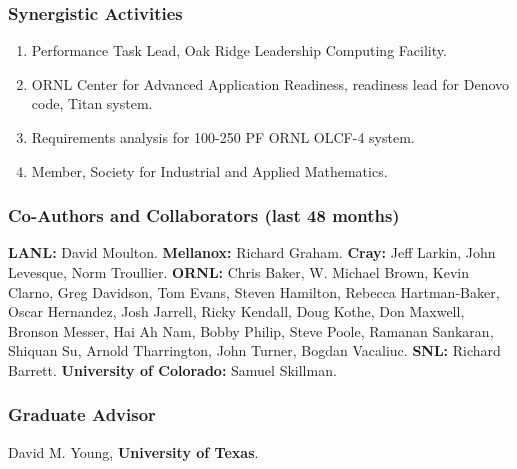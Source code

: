 
\vspace*{-3ex}
\subsubsection*{Synergistic Activities}
\vspace{-1ex}
%
\begin{enumerate}
\item Performance Task Lead, Oak Ridge Leadership Computing Facility.
\item ORNL Center for Advanced Application Readiness, readiness lead for Denovo code, Titan system.
\item Requirements analysis for 100-250 PF ORNL OLCF-4 system.
\item Member, Society for Industrial and Applied Mathematics.
\end{enumerate}


\vspace*{-3ex}
\subsubsection*{Co-Authors and Collaborators (last 48 months)}
\vspace{-1ex}

{\bf LANL:} David Moulton.
{\bf Mellanox:} Richard Graham.
{\bf Cray:} Jeff Larkin, John Levesque, Norm Troullier.
{\bf ORNL:} Chris Baker, W. Michael Brown, Kevin Clarno, Greg Davidson, Tom Evans, Steven Hamilton, Rebecca Hartman-Baker, Oscar Hernandez, Josh Jarrell, Ricky Kendall, Doug Kothe, Don Maxwell, Bronson Messer, Hai Ah Nam, Bobby Philip, Steve Poole, Ramanan Sankaran, Shiquan Su, Arnold Tharrington, John Turner, Bogdan Vacaliuc.
{\bf SNL:} Richard Barrett.
{\bf University of Colorado:} Samuel Skillman.

\vspace*{-2ex}
\subsubsection*{Graduate Advisor}
\vspace{-1ex}
David M. Young, {\bf University of Texas}.

\pagebreak
\endinput


